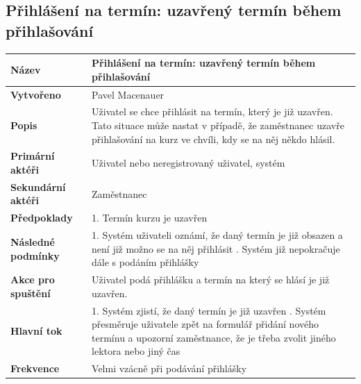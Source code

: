 \documentclass[12pt,a4paper,titlepage,final]{report}
\begin{document}
\subsection{Přihlášení na termín: uzavřený termín během přihlašování}
\begin{center}
    \begin{tabular}{ | p{4.5cm} | p{13cm} | }
    \hline
    \textbf{Název} & Přihlášení na termín: uzavřený termín během přihlašování
    \\ \hline
    
	\textbf{Vytvořeno} & Pavel Macenauer 
	\\ \hline
	
	\textbf{Popis} & Uživatel se chce přihlásit na termín, který je již uzavřen. Tato situace může nastat v případě, že zaměstnanec uzavře přihlašování na kurz ve chvíli, kdy se na něj někdo hlásil.
	\\ \hline
	    
	\textbf{Primární aktéři} & Uživatel nebo neregistrovaný uživatel, systém
	\\ \hline
	
	\textbf{Sekundární aktéři} & Zaměstnanec   
	\\ \hline
	
	\textbf{Předpoklady} & 1. Termín kurzu je uzavřen
    \\ \hline
    
    \textbf{Následné podmínky} & 1. Systém uživateli oznámí, že daný termín je již obsazen a není již možno se na něj přihlásit
	    \newline 2. Systém již nepokračuje dále s podáním přihlášky
    \\ \hline 
        
    \textbf{Akce pro spuštění} & Uživatel podá přihlášku a termín na který se hlásí je již uzavřen.
    \\ \hline
    
    \textbf{Hlavní tok} & 1. Systém zjistí, že daný termín je již uzavřen
    	\newline 2. Systém přesměruje uživatele zpět na formulář přidání nového termínu a upozorní zaměstnance, že je třeba zvolit jiného lektora nebo jiný čas
    \\ \hline    
    
	\textbf{Frekvence} & Velmi vzácně při podávání přihlášky
	\\ \hline
	\end{tabular}
\end{center}
\end{document}
